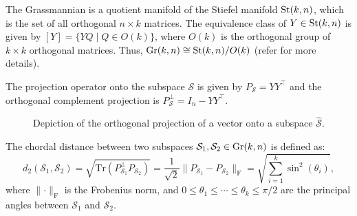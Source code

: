 The Grassmannian is a quotient manifold of the Stiefel manifold $\text{St}(k,n)$, which is the set of all orthogonal $n \times k$ matrices. The equivalence class of $Y \in \text{St}(k,n)$ is given by $[Y] = \{ Y Q \mid Q \in O(k) \}$, where $O(k)$ is the orthogonal group of $k \times k$ orthogonal matrices. Thus, $\text{Gr}(k,n) \cong \text{St}(k,n) / O(k)$ (refer \cite{boumal2023} for more details).

The projection operator onto the subspace $\mathcal{S}$ is given by $P_{\mathcal{S}} = Y Y^\top$ and the orthogonal complement projection is $P_{\mathcal{S}}^{\perp} = I_n - Y Y^\top$.

\begin{figure}[h]
    \centering
{}
\caption{Depiction of the orthogonal projection of a vector onto a subspace $\hat{\mathcal{S}}$.}
\end{figure}

\begin{definition}\label{defn:chordal}
    The chordal distance between two subspaces $\mathcal{S}_1, \mathcal{S}_2 \in \text{Gr}(k,n)$ is defined as:
    \[
        d_{2}(\mathcal{S}_1, \mathcal{S}_2) = \sqrt{\mathrm{Tr}\left(P_{\mathcal{S}_1}^\perp P_{\mathcal{S}_2}\right)} = \frac{1}{\sqrt{2}}\lVert P_{\mathcal{S}_1} - P_{\mathcal{S}_2} \rVert_{\mathrm{F}} = \sqrt{\sum_{i=1}^{k} \sin^2(\theta_i)},
    \]
    where $\lVert \cdot \rVert_{\mathrm{F}}$ is the Frobenius norm, and $0 \leq \theta_1 \leq \cdots \leq \theta_k \leq \pi/2$ are the principal angles between $\mathcal{S}_1$ and $\mathcal{S}_2$.
    
\end{definition}

